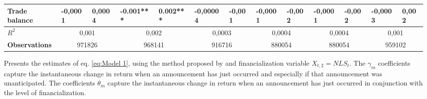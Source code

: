 \begin{landscape}
\begin{table}[]
{\begin{tabular}{@{}lllllllllllll@{}}
\textbf{Trade balance}            & -0,0001             & 0,0004              & -0.001***           & 0.002***            & -0,00004            & -0,001              & -0,0001             & -0,002              & -0,0001             & -0,002              & -0,0003             & 0,002               \\ \midrule
\textbf{$R^2$}                    & \multicolumn{2}{c}{0,001}                 & \multicolumn{2}{c}{0,002}                 & \multicolumn{2}{c}{0,0003}                & \multicolumn{2}{c}{0,0004}                & \multicolumn{2}{c}{0,0004}                & \multicolumn{2}{c}{0,001}                 \\
\textbf{Observations}             & \multicolumn{2}{c}{971826}                & \multicolumn{2}{c}{968141}                & \multicolumn{2}{c}{916716}                & \multicolumn{2}{c}{880054}                & \multicolumn{2}{c}{880054}                & \multicolumn{2}{c}{959102}                \\ \bottomrule
\end{tabular}%
}

\begin{tablenotes}
        \singlespacing
        \footnotesize
Presents the estimates of eq. \ref{eq:Model 1}, using the method proposed by \citep{kurov2019price} and financialization variable $X_{t,2}=NLS_t$. The $\gamma_m$ coefficients capture the instantaneous change in return when an announcement has just occurred and especially if that announcement was unanticipated. The coefficients $\theta_m$ capture the instantaneous change in return when an announcement has just occurred in conjunction with the level of financialization.

    \end{tablenotes}
\end{table}
\end{landscape}

